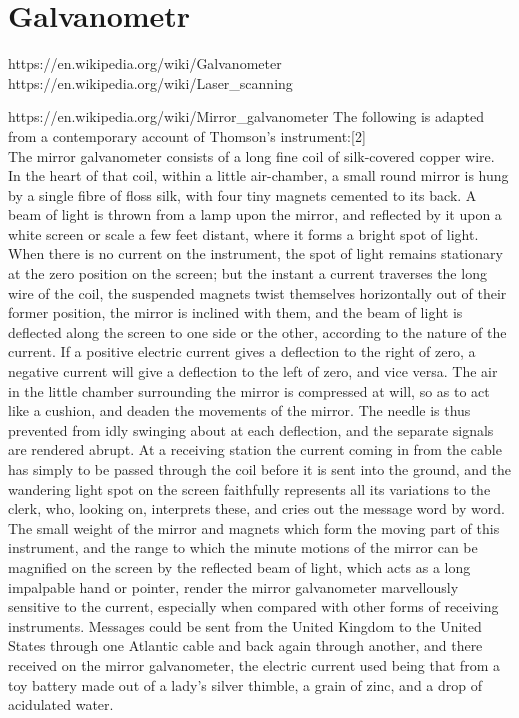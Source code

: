 \documentclass{template/socthesis}
\begin{document}
\section{Galvanometr}
https://en.wikipedia.org/wiki/Galvanometer \\
https://en.wikipedia.org/wiki/Laser\_scanning


https://en.wikipedia.org/wiki/Mirror\_galvanometer
The following is adapted from a contemporary account of Thomson's instrument:[2]\\
The mirror galvanometer consists of a long fine coil of silk-covered copper wire. In the heart of that coil, within a little air-chamber, a small round mirror is hung by a single fibre of floss silk, with four tiny magnets cemented to its back. A beam of light is thrown from a lamp upon the mirror, and reflected by it upon a white screen or scale a few feet distant, where it forms a bright spot of light. When there is no current on the instrument, the spot of light remains stationary at the zero position on the screen; but the instant a current traverses the long wire of the coil, the suspended magnets twist themselves horizontally out of their former position, the mirror is inclined with them, and the beam of light is deflected along the screen to one side or the other, according to the nature of the current. If a positive electric current gives a deflection to the right of zero, a negative current will give a deflection to the left of zero, and vice versa.
The air in the little chamber surrounding the mirror is compressed at will, so as to act like a cushion, and deaden the movements of the mirror. The needle is thus prevented from idly swinging about at each deflection, and the separate signals are rendered abrupt. At a receiving station the current coming in from the cable has simply to be passed through the coil before it is sent into the ground, and the wandering light spot on the screen faithfully represents all its variations to the clerk, who, looking on, interprets these, and cries out the message word by word. The small weight of the mirror and magnets which form the moving part of this instrument, and the range to which the minute motions of the mirror can be magnified on the screen by the reflected beam of light, which acts as a long impalpable hand or pointer, render the mirror galvanometer marvellously sensitive to the current, especially when compared with other forms of receiving instruments. Messages could be sent from the United Kingdom to the United States through one Atlantic cable and back again through another, and there received on the mirror galvanometer, the electric current used being that from a toy battery made out of a lady's silver thimble, a grain of zinc, and a drop of acidulated water.
\end{document}
